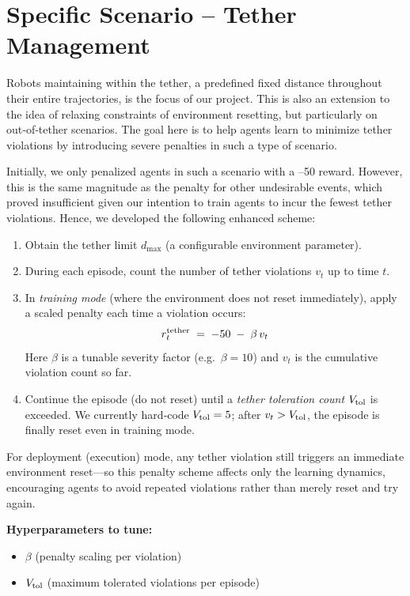 \documentclass[a4paper,11pt]{article}
\begin{document}
\section{Specific Scenario – Tether Management}

Robots maintaining within the tether, a predefined fixed distance throughout their entire trajectories, is the focus of our project. This is also an extension to the idea of relaxing constraints of environment resetting, but particularly on out‑of‑tether scenarios. The goal here is to help agents learn to minimize tether violations by introducing severe penalties in such a type of scenario.

Initially, we only penalized agents in such a scenario with a –50 reward. However, this is the same magnitude as the penalty for other undesirable events, which proved insufficient given our intention to train agents to incur the fewest tether violations. Hence, we developed the following enhanced scheme:

\begin{enumerate}
  \item Obtain the tether limit \(d_{\max}\) (a configurable environment parameter).
  \item During each episode, count the number of tether violations \(v_t\) up to time \(t\).
  \item In \emph{training mode} (where the environment does not reset immediately), apply a scaled penalty each time a violation occurs:
  \[
    r_t^{\rm tether} \;=\; -50 \;-\; \beta \, v_t
  \]
  Here \(\beta\) is a tunable severity factor (e.g.\ \(\beta=10\)) and \(v_t\) is the cumulative violation count so far.
  \item Continue the episode (do not reset) until a \emph{tether toleration count} \(V_{\rm tol}\) is exceeded.  We currently hard‑code \(V_{\rm tol}=5\); after \(v_t>V_{\rm tol}\), the episode is finally reset even in training mode.
\end{enumerate}

For deployment (execution) mode, any tether violation still triggers an immediate environment reset—so this penalty scheme affects only the learning dynamics, encouraging agents to avoid repeated violations rather than merely reset and try again.

\bigskip
\noindent\textbf{Hyperparameters to tune:}
\begin{itemize}
  \item \(\beta\) (penalty scaling per violation)
  \item \(V_{\rm tol}\) (maximum tolerated violations per episode)
\end{itemize}
\end{document}

